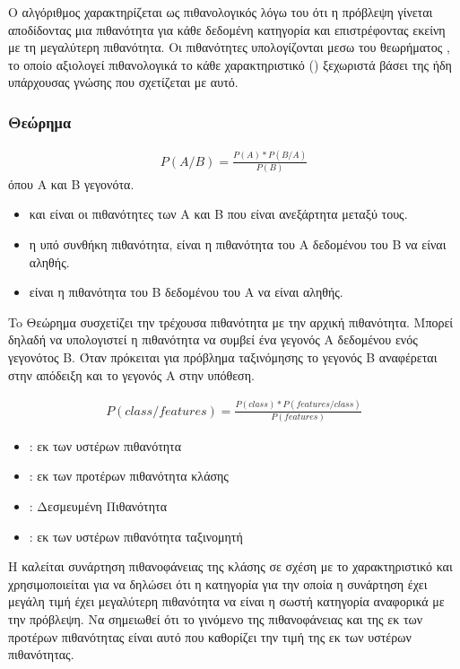 Ο αλγόριθμος  χαρακτηρίζεται ως πιθανολογικός λόγω του ότι η πρόβλεψη γίνεται αποδίδοντας μια πιθανότητα για κάθε δεδομένη κατηγορία και επιστρέφοντας εκείνη με τη μεγαλύτερη πιθανότητα. Οι πιθανότητες υπολογίζονται μεσω του θεωρήματος , το οποίο αξιολογεί πιθανολογικά το κάθε χαρακτηριστικό () ξεχωριστά βάσει της ήδη υπάρχουσας γνώσης που σχετίζεται με αυτό.

\subsubsection{Θεώρημα }

\begin{align*}
    P(A/B) = \frac{P(A) * P(B/A)}{P(B)}
\end{align*}
όπου Α και Β γεγονότα.
\begin{itemize}
    \item {} και  είναι οι πιθανότητες των A και B που είναι ανεξάρτητα μεταξύ τους.
    \item {} η υπό συνθήκη πιθανότητα, είναι η πιθανότητα του A δεδομένου του B να είναι αληθής.
    \item {} είναι η πιθανότητα του B δεδομένου του A να είναι αληθής.
\end{itemize} \cite{bayesTheorem}

To Θεώρημα  συσχετίζει την τρέχουσα πιθανότητα με την αρχική πιθανότητα. Μπορεί δηλαδή να υπολογιστεί η πιθανότητα να συμβεί ένα γεγονός Α δεδομένου ενός γεγονότος Β. Όταν πρόκειται για πρόβλημα ταξινόμησης το γεγονός Β αναφέρεται στην απόδειξη και το γεγονός Α στην υπόθεση.


\begin{align*}
    P(class/features) = \frac{P(class) * P(features/class)}{P(features)}
\end{align*}

\begin{itemize}
    \item {} : εκ των υστέρων πιθανότητα
    \item {} : εκ των προτέρων πιθανότητα κλάσης
    \item {} : Δεσμευμένη Πιθανότητα
    \item {} : εκ των υστέρων πιθανότητα ταξινομητή
\end{itemize}


Η  καλείται συνάρτηση πιθανοφάνειας της κλάσης σε σχέση με το χαρακτηριστικό και χρησιμοποιείται για 
να δηλώσει ότι η κατηγορία για την οποία η συνάρτηση έχει μεγάλη τιμή έχει μεγαλύτερη πιθανότητα να  είναι η  σωστή κατηγορία αναφορικά με την πρόβλεψη. Να σημειωθεί ότι το γινόμενο της  πιθανοφάνειας και της εκ των προτέρων πιθανότητας είναι αυτό που  καθορίζει την τιμή της εκ των υστέρων πιθανότητας.

